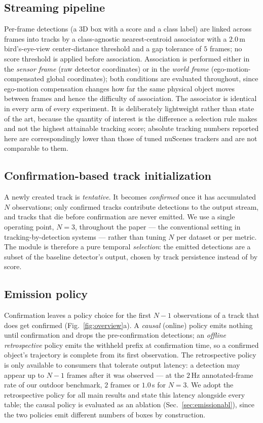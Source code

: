 \subsection{Streaming pipeline}
\label{sec:pipeline}
Per-frame detections (a 3D box with a score and a class label) are linked
across frames into tracks by a class-agnostic nearest-centroid associator with
a $2.0$\,m bird's-eye-view center-distance threshold and a gap tolerance of
$5$ frames; no score threshold is applied before association. Association is
performed either in the \emph{sensor frame} (raw detector coordinates) or in
the \emph{world frame} (ego-motion-compensated global coordinates); both
conditions are evaluated throughout, since ego-motion compensation changes how
far the same physical object moves between frames and hence the difficulty of
association. The associator is identical in every arm of every experiment. It
is deliberately lightweight rather than state of the art, because the quantity
of interest is the difference a selection rule makes and not the highest
attainable tracking score; absolute tracking numbers reported here are
correspondingly lower than those of tuned nuScenes trackers and are not
comparable to them.

\subsection{Confirmation-based track initialization}
\label{sec:confirmation}
A newly created track is \emph{tentative}. It becomes \emph{confirmed} once it
has accumulated $N$ observations; only confirmed tracks contribute detections
to the output stream, and tracks that die before confirmation are never
emitted. We use a single operating point, $N{=}3$, throughout the paper ---
the conventional setting in tracking-by-detection systems --- rather than
tuning $N$ per dataset or per metric. The module is therefore a pure temporal
\emph{selection}: the emitted detections are a subset of the baseline
detector's output, chosen by track persistence instead of by score.

\subsection{Emission policy}
\label{sec:emission}
Confirmation leaves a policy choice for the first $N{-}1$ observations of a
track that does get confirmed (Fig.~\ref{fig:overview}a). A \emph{causal}
(online) policy emits nothing until confirmation and drops the
pre-confirmation detections; an \emph{offline retrospective} policy emits the
withheld prefix at confirmation time, so a confirmed object's trajectory is
complete from its first observation.
The retrospective policy is only available to consumers that tolerate output
latency: a detection may appear up to $N{-}1$ frames after it was observed ---
at the $2$\,Hz annotated-frame rate of our outdoor benchmark, $2$ frames or
$1.0$\,s for $N{=}3$. We adopt the retrospective policy for all main results
and state this latency alongside every table; the causal policy is evaluated
as an ablation (Sec.~\ref{sec:emissionabl}), since the two policies emit
different numbers of boxes by construction.

